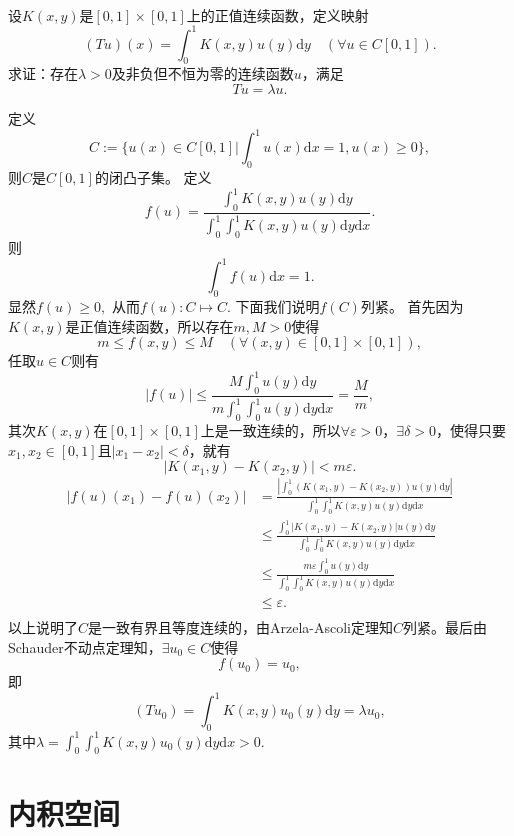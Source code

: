 \begin{exercise}
\hfill\\
设$K(x,y)$是$[0,1]\times[0,1]$上的正值连续函数，定义映射
$$(Tu)(x)=\int_0^1K(x,y)u(y)\mathrm{d}y\quad(\forall u\in C[0,1]).$$
求证：存在$\lambda>0$及非负但不恒为零的连续函数$u$，满足
$$Tu=\lambda u.$$

定义
$$C:=\{u(x)\in C[0,1]|\int_0^1u(x)\mathrm{d}x=1,u(x)\geq0\},$$
则$C$是$C[0,1]$的闭凸子集。
定义
$$f(u)=\frac{\int_0^1K(x,y)u(y)\mathrm{d}y}{\int_0^1\int_0^1K(x,y)u(y)\mathrm{d}y\mathrm{d}x}.$$
则$$\int_0^1f(u)\mathrm{d}x=1.$$显然$f(u)\geq0,$
从而$f(u):C\mapsto C.$
下面我们说明$f(C)$列紧。
首先因为$K(x,y)$是正值连续函数，所以存在$m,M>0$使得
$$m\leq f(x,y)\leq M\quad(\forall(x,y)\in[0,1]\times[0,1]),$$
任取$u\in C$则有
$$|f(u)|\leq\frac{M\int_0^1u(y)\mathrm{d}y}{m\int_0^1\int_0^1u(y)\mathrm{d}y\mathrm{d}x}=\frac{M}{m},$$
其次$K(x,y)$在$[0,1]\times[0,1]$上是一致连续的，所以$\forall\varepsilon>0$，$\exists\delta>0$，使得只要$x_1,x_2\in[0,1]$且$|x_1-x_2|<\delta$，就有$$|K(x_1,y)-K(x_2,y)|<m\varepsilon.$$
\begin{align*}
|f(u)(x_1)-f(u)(x_2)|&=\frac{|\int_0^1(K(x_1,y)-K(x_2,y))u(y)\mathrm{d}y|}{\int_0^1\int_0^1K(x,y)u(y)\mathrm{d}y\mathrm{d}x}\\
&\leq\frac{\int_0^1|K(x_1,y)-K(x_2,y)|u(y)\mathrm{d}y}{\int_0^1\int_0^1K(x,y)u(y)\mathrm{d}y\mathrm{d}x}\\
&\leq\frac{m\varepsilon\int_0^1u(y)\mathrm{d}y}{\int_0^1\int_0^1K(x,y)u(y)\mathrm{d}y\mathrm{d}x}\\
&\leq\varepsilon.\\
\end{align*}
以上说明了$C$是一致有界且等度连续的，由Arzela-Ascoli定理知$C$列紧。最后由Schauder不动点定理知，$\exists u_0\in C$使得$$f(u_0)=u_0,$$
即
$$(Tu_0)=\int_0^1K(x,y)u_0(y)\mathrm{d}y=\lambda u_0,$$其中$\lambda=\int_0^1\int_0^1K(x,y)u_0(y)\mathrm{d}y\mathrm{d}x>0.$
\end{exercise}

\section{内积空间}


